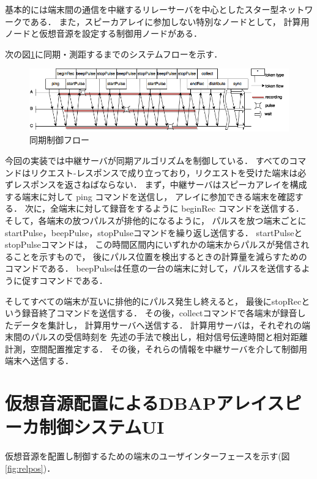 基本的には端末間の通信を中継するリレーサーバを中心としたスター型ネットワークである．
また，スピーカアレイに参加しない特別なノードとして，
計算用ノードと仮想音源を設定する制御用ノードがある．

次の図\ref{fig:flowchart}に同期・測距するまでのシステムフローを示す．

\begin{figure}[p]\centering
  \hspace{-2mm}\includegraphics[clip,width=1.1\hsize]{img/flowchart.png}
  \caption{同期制御フロー}\label{fig:flowchart}
\end{figure}

今回の実装では中継サーバが同期アルゴリズムを制御している．
すべてのコマンドはリクエスト-レスポンスで成り立っており，リクエストを受けた端末は必ずレスポンスを返さねばならない．
まず，中継サーバはスピーカアレイを構成する端末に対して ping コマンドを送信し，
アレイに参加できる端末を確認する．
次に，全端末に対して録音をするように beginRec コマンドを送信する．
そして，各端末の放つパルスが排他的になるように，
パルスを放つ端末ごとにstartPulse，beepPulse，stopPulseコマンドを繰り返し送信する．
startPulseとstopPulseコマンドは，
この時間区間内にいずれかの端末からパルスが発信されることを示すもので，
後にパルス位置を検出するときの計算量を減らすためのコマンドである．
beepPulseは任意の一台の端末に対して，パルスを送信するように促すコマンドである．

そしてすべての端末が互いに排他的にパルス発生し終えると，
最後にstopRecという録音終了コマンドを送信する．
その後，collectコマンドで各端末が録音したデータを集計し，
計算用サーバへ送信する．
計算用サーバは，それぞれの端末間のパルスの受信時刻を
先述の手法で検出し，相対信号伝達時間と相対距離計測，空間配置推定する．
その後，それらの情報を中継サーバを介して制御用端末へ送信する．

\section{仮想音源配置によるDBAPアレイスピーカ制御システムUI}

仮想音源を配置し制御するための端末のユーザインターフェースを示す(図\ref{fig:relpos})．

